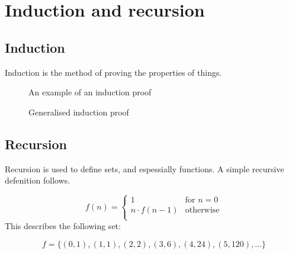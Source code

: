 \documentclass[12pt]{article} %
\begin{document}
\section{Induction and recursion}

\subsection{Induction} Induction is the method of proving the properties of things.

\begin{figure}[H]
\caption{An example of an induction proof}
\label{Induction example}
\end{figure}

\begin{figure}[H]
\caption{Generalised induction proof}
\label{Induction generalised}
\end{figure}

\subsection{Recursion} Recursion is used to define sets, and espessially functions. A simple recursive defenition follows.

\[
f(n) =
    \begin{cases}
        1 & \text{for } n = 0\\
        n \cdot f(n - 1) & \text{otherwise}\\ 
    \end{cases}
\]
This describes the following set: 

\[
    f= \{(0,1),(1,1),(2,2),(3,6),(4,24),(5,120),\ldots\}
\]
\end{document}
